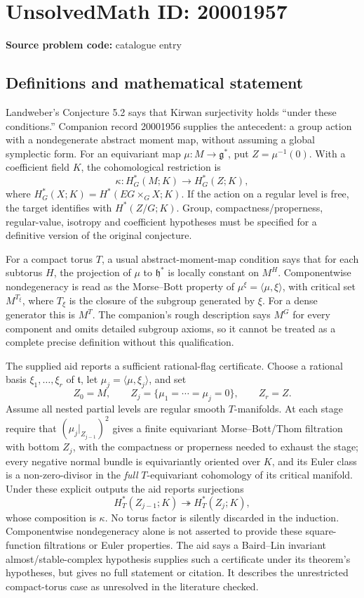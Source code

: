 \documentclass[11pt]{article}
\begin{document}
\section*{UnsolvedMath ID: 20001957}
\textbf{Source problem code:} catalogue entry
\subsection{Definitions and mathematical statement}
Landweber's Conjecture 5.2 says that Kirwan surjectivity holds ``under these conditions.'' Companion record 20001956 supplies the antecedent: a group action with a nondegenerate abstract moment map, without assuming a global symplectic form. For an equivariant map \(\mu:M\to\mathfrak g^*\), put \(Z=\mu^{-1}(0)\). With a coefficient field \(K\), the cohomological restriction is
\[
\kappa:H_G^*(M;K)\longrightarrow H_G^*(Z;K),
\]
where \(H_G^*(X;K)=H^*(EG\times_GX;K)\). If the action on a regular level is free, the target identifies with \(H^*(Z/G;K)\). Group, compactness/properness, regular-value, isotropy and coefficient hypotheses must be specified for a definitive version of the original conjecture.

For a compact torus \(T\), a usual abstract-moment-map condition says that for each subtorus \(H\), the projection of \(\mu\) to \(\mathfrak h^*\) is locally constant on \(M^H\). Componentwise nondegeneracy is read as the Morse--Bott property of \(\mu^\xi=\langle\mu,\xi\rangle\), with critical set \(M^{T_\xi}\), where \(T_\xi\) is the closure of the subgroup generated by \(\xi\). For a dense generator this is \(M^T\). The companion's rough description says \(M^G\) for every component and omits detailed subgroup axioms, so it cannot be treated as a complete precise definition without this qualification.

The supplied aid reports a sufficient rational-flag certificate. Choose a rational basis \(\xi_1,\ldots,\xi_r\) of \(\mathfrak t\), let \(\mu_j=\langle\mu,\xi_j\rangle\), and set
\[
Z_0=M,\qquad Z_j=\{\mu_1=\cdots=\mu_j=0\},\qquad Z_r=Z.
\]
Assume all nested partial levels are regular smooth \(T\)-manifolds. At each stage require that \((\mu_j|_{Z_{j-1}})^2\) gives a finite equivariant Morse--Bott/Thom filtration with bottom \(Z_j\), with the compactness or properness needed to exhaust the stage; every negative normal bundle is equivariantly oriented over \(K\), and its Euler class is a non-zero-divisor in the \emph{full} \(T\)-equivariant cohomology of its critical manifold. Under these explicit outputs the aid reports surjections
\[
H_T^*(Z_{j-1};K)\twoheadrightarrow H_T^*(Z_j;K),
\]
whose composition is \(\kappa\). No torus factor is silently discarded in the induction. Componentwise nondegeneracy alone is not asserted to provide these square-function filtrations or Euler properties. The aid says a Baird--Lin invariant almost/stable-complex hypothesis supplies such a certificate under its theorem's hypotheses, but gives no full statement or citation. It describes the unrestricted compact-torus case as unresolved in the literature checked.
\end{document}
